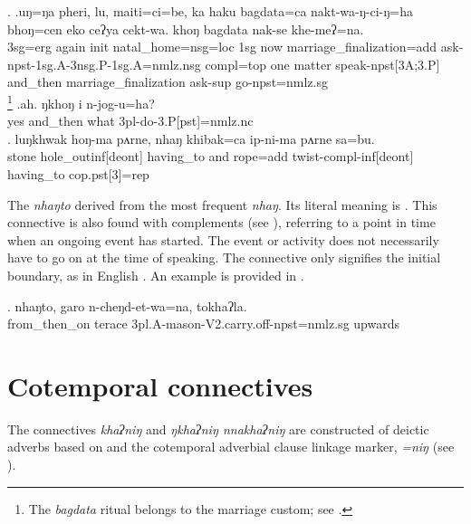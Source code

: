 \ex. \ag.uŋ=ŋa pheri, lu, maiti=ci=be, ka haku bagdata=ca nakt-wa-ŋ-ci-ŋ=ha bhoŋ=cen eko ceʔya cekt-wa. khoŋ bagdata  nak-se khe-meʔ=na.\\
{\sc 3sg=erg} again {\sc init} natal\_home{\sc =nsg=loc} {\sc 1sg} now marriage\_finalization{\sc =add} ask{\sc -npst-1sg.A-3nsg.P-1sg.A=nmlz.nsg} {\sc compl=top} one matter speak{\sc -npst[3A;3.P]} and\_then marriage\_finalization ask{\sc -sup} go{\sc [3]-npst=nmlz.sg}\\
\footnote{The \emph{bagdata} ritual belongs to the  marriage custom; see .} 
\bg.ah.    ŋkhoŋ    i    n-jog-u=ha?\\
yes and\_then what {\sc 3pl-}do{\sc -3.P[pst]=nmlz.nc}\\
 
\bg. luŋkhwak hoŋ-ma                pʌrne, nhaŋ     khibak=ca        ip-ni-ma                       pʌrne    sa=bu.\\
stone hole\_out{\sc inf[deont]} having\_to and rope{\sc =add} twist{\sc -compl-inf[deont]} having\_to {\sc cop.pst[3]=rep}\\
 


The  \emph{nhaŋto} derived from the most frequent  \emph{nhaŋ}. Its literal meaning is . This connective is also found with complements (see ), referring to a point in time when an ongoing event has started. The event or activity does not necessarily have to go on at the time of speaking. The connective only signifies the initial boundary, as in English . An example is provided in \Next.
 
\exg. nhaŋto, garo    n-cheŋd-et-wa=na,  tokhaʔla.\\
from\_then\_on terace {\sc 3pl.A-}mason{\sc -V2.carry.off-npst=nmlz.sg} upwards\\
 

\section{Cotemporal connectives} 

The  connectives \emph{khaʔniŋ} and \emph{ŋkhaʔniŋ \ti nnakhaʔniŋ} are constructed of deictic adverbs based on  and the cotemporal adverbial clause linkage marker, \emph{=niŋ} (see \Next).

